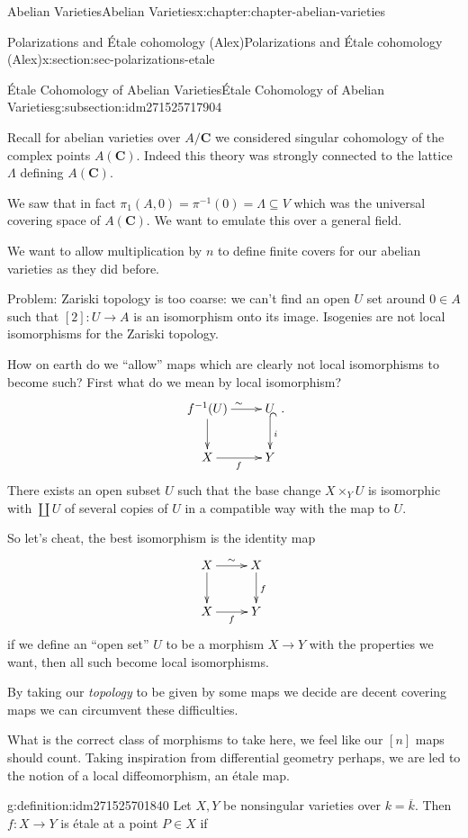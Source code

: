 \documentclass[oneside,10pt,]{book}
\numberwithin{equation}{section}
\newcommand{\lb}{[}
\newcommand{\rb}{]}
\newcommand{\CC}{\mathbf{C}}
\begin{document}
\begin{chapterptx}{Abelian Varieties}{}{Abelian Varieties}{}{}{x:chapter:chapter-abelian-varieties}
\begin{sectionptx}{Polarizations and Étale cohomology (Alex)}{}{Polarizations and Étale cohomology (Alex)}{}{}{x:section:sec-polarizations-etale}
\begin{subsectionptx}{Étale Cohomology of Abelian Varieties}{}{Étale Cohomology of Abelian Varieties}{}{}{g:subsection:idm271525717904}
\par
Recall for abelian varieties over \(A/\CC\) we considered singular cohomology of the complex points \(A(\CC)\). Indeed this theory was strongly connected to the lattice \(\Lambda\) defining \(A(\CC)\).%
\par
We saw that in fact \(\pi_1(A,0) = \pi^{-1} (0) = \Lambda \subseteq V\) which was the universal covering space of \(A(\CC)\). We want to emulate this over a general field.%
\par
We want to allow multiplication by \(n\) to define finite covers for our abelian varieties as they did before.%
\par
Problem: Zariski topology is too coarse: we can't find an open \(U\) set around \(0 \in A\) such that \(\lb 2\rb \colon U \to A\) is an isomorphism onto its image. Isogenies are not local isomorphisms for the Zariski topology.%
\par
How on earth do we ``allow'' maps which are clearly not local isomorphisms to become such? First what do we mean by local isomorphism?%
\begin{equation*}
\xymatrix{
f^{-1}(U)\ar[d] \ar[r]^{\sim} & U\ar@{^(->}[d]^i\\
X \ar[r]_f & Y
}\text{.}
\end{equation*}
There exists an open subset \(U\) such that the base change \(X \times_Y U\) is isomorphic with \(\coprod U\) of several copies of \(U\) in a compatible way with the map to \(U\).%
\par
So let's cheat, the best isomorphism is the identity map%
\begin{equation*}
\xymatrix{
X\ar[d] \ar[r]^{\sim} & X\ar[d]^f\\
X \ar[r]_f & Y
}
\end{equation*}
if we define an ``open set'' \(U\) to be a morphism \(X \to Y\) with the properties we want, then all such become local isomorphisms.%
\par
By taking our \emph{topology} to be given by some maps we decide are decent covering maps we can circumvent these difficulties.%
\par
What is the correct class of morphisms to take here, we feel like our \(\lb n\rb\) maps should count. Taking inspiration from differential geometry perhaps, we are led to the notion of a local diffeomorphism, an étale map.%
\begin{definition}{}{g:definition:idm271525701840}%
Let \(X,Y\) be nonsingular varieties over \(k = \overline k\). Then \(f\colon X\to Y\) is étale at a point \(P\in X\) if%

\end{definition}
\end{subsectionptx}
\end{sectionptx}
\end{chapterptx}
\end{document}
